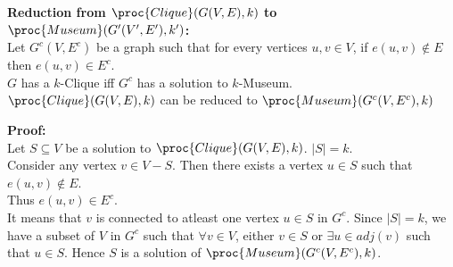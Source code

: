 \documentclass[11pt]{article}
\begin{document}
\begin{enumerate}
    \noindent\textbf{Reduction from $\proc{Clique}(G(V, E),k)$ to $\proc{Museum}(G'(V', E'),k')$:}\\
    Let $G^c(V, E^c)$ be a graph such that for every vertices $u,v \in V$, if $e(u,v) \notin E$ then $e(u,v) \in E^c$.\\
    $G$ has a $k$-Clique iff $G^c$ has a solution to $k$-Museum.\\
    $\proc{Clique}(G(V, E),k)$ can be reduced to $\proc{Museum}(G^c(V, E^c),k)$
    
    \noindent\textbf{Proof:}\\
    Let $S \subseteq V$ be a solution to $\proc{Clique}(G(V, E),k)$. $|S| = k$.\\
    Consider any vertex $v \in V-S$. Then there exists a vertex $u \in S$ such that $e(u, v) \notin E$.\\
    Thus $e(u,v) \in E^c$.\\
    It means that $v$ is connected to atleast one vertex $u \in S$ in $G^c$. Since $|S| = k$, we have a subset of $V$ in $G^c$ such that $\forall v \in V$, either $v \in S$ or $\exists u \in adj(v)$ such that $u \in S$. Hence $S$ is a solution of $\proc{Museum}(G^c(V, E^c),k)$.
    
    
    
    
    
    
    
    
    
    
    
    
\end{enumerate}
\end{document}
